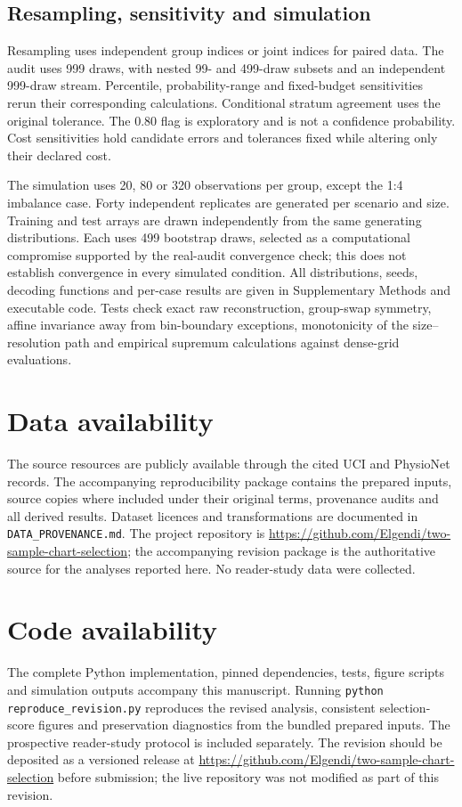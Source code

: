 \documentclass[11pt]{article}
\begin{document}
\subsection*{Resampling, sensitivity and simulation}
Resampling uses independent group indices or joint indices for paired data. The audit uses 999 draws, with nested 99- and 499-draw subsets and an independent 999-draw stream. Percentile, probability-range and fixed-budget sensitivities rerun their corresponding calculations. Conditional stratum agreement uses the original tolerance. The 0.80 flag is exploratory and is not a confidence probability. Cost sensitivities hold candidate errors and tolerances fixed while altering only their declared cost.

The simulation uses 20, 80 or 320 observations per group, except the 1:4 imbalance case. Forty independent replicates are generated per scenario and size. Training and test arrays are drawn independently from the same generating distributions. Each uses 499 bootstrap draws, selected as a computational compromise supported by the real-audit convergence check; this does not establish convergence in every simulated condition. All distributions, seeds, decoding functions and per-case results are given in Supplementary Methods and executable code. Tests check exact raw reconstruction, group-swap symmetry, affine invariance away from bin-boundary exceptions, monotonicity of the size--resolution path and empirical supremum calculations against dense-grid evaluations.

\section*{Data availability}
The source resources are publicly available through the cited UCI and PhysioNet records. The accompanying reproducibility package contains the prepared inputs, source copies where included under their original terms, provenance audits and all derived results. Dataset licences and transformations are documented in \texttt{DATA\_PROVENANCE.md}. The project repository is \url{https://github.com/Elgendi/two-sample-chart-selection}; the accompanying revision package is the authoritative source for the analyses reported here. No reader-study data were collected.

\section*{Code availability}
The complete Python implementation, pinned dependencies, tests, figure scripts and simulation outputs accompany this manuscript. Running \texttt{python reproduce\_revision.py} reproduces the revised analysis, consistent selection-score figures and preservation diagnostics from the bundled prepared inputs. The prospective reader-study protocol is included separately. The revision should be deposited as a versioned release at \url{https://github.com/Elgendi/two-sample-chart-selection} before submission; the live repository was not modified as part of this revision.
\end{document}
